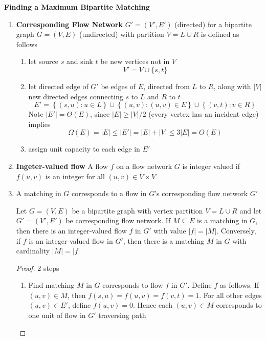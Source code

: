 \documentclass[11pt]{article}
\begin{document}
\begin{defn*}
    \textbf{Finding a Maximum Bipartite Matching}
    \begin{enumerate}
        \item \textbf{Corresponding Flow Network} $G' = (V', E')$ (directed) for a bipartite graph $G = (V,E)$ (undirected) with partition $V = L \cup R$ is defined as follows 
        \begin{enumerate}
            \item let source $s$ and sink $t$ be new vertices not in $V$
            \[
                V' = V \cup \{ s, t\}
            \]
            \item let directed edge of $G'$ be edges of $E$, directed from $L$ to $R$, along with $|V|$ new directed edges connecting $s$ to $L$ and $R$ to $t$
            \[
                E' = \left\{ (s,u): u\in L \right\} \cup  \left\{ (u,v):(u,v)\in E \right\} \cup \left\{ (v,t): v\in R \right\} 
            \]
            Note $|E'| = \Theta(E)$, since $|E| \geq |V|/2$ (every vertex has an incident edge) implies 
            \[
                \Omega(E) = |E| \leq |E'| = |E| + |V| \leq 3|E| = O(E)
            \]
            \item assign unit capacity to each edge in $E'$ 
        \end{enumerate}
        \item \textbf{Ingeter-valued flow} A flow $f$ on a flow network $G$ is integer valued if $f(u,v)$ is an integer for all $(u,v)\in V\times V$
        \item A matching in $G$ corresponds to a flow in $G$'s corresponding flow network $G'$
        \begin{lemma*}
            Let $G = (V,E)$ be a bipartite graph with vertex partition $V = L \cup R$ and let $G' = (V', E')$ be corresponding flow network. If $M \subseteq E$ is a matching in $G$, then there is an integer-valued flow $f$ in $G'$ with value $|f| = |M|$. Conversely, if $f$ is an integer-valued flow in $G'$, then there is a matching $M$ in $G$ with cardinality $|M| = |f|$
            \begin{proof} 2 steps
                \begin{enumerate}
                    \item Find matching $M$ in $G$ corresponds to flow $f$ in $G'$. Define $f$ as follows. If $(u,v)\in M$, then $f(s,u) = f(u,v) =  f(v,t) = 1$. For all other edges $(u,v)\in E'$, define $f(u,v) = 0$. Hence each $(u,v)\in M$ corresponds to one unit of flow in $G'$ traversing path 

\end{enumerate}
\end{proof}
\end{lemma*}
\end{enumerate}
\end{defn*}
\end{document}
